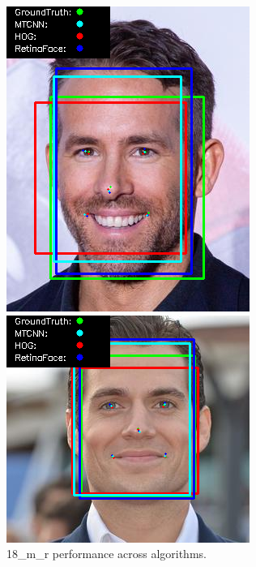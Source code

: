 \documentclass{l4proj}
\begin{document}
\begin{appendices}
\begin{figure}[h!]
  \centering
  \begin{minipage}{0.49\textwidth}
    \centering
     \includegraphics[width=\textwidth]{images/appendix/18.png}
    \caption{18\_m\_r performance across algorithms.}
    \label{whoopi_result}
  \end{minipage}
    \hfill
    \begin{minipage}{0.49\textwidth}
    \centering
     \includegraphics[width=\textwidth]{images/appendix/19.png}

\end{minipage}
\end{figure}
\end{appendices}
\end{document}
